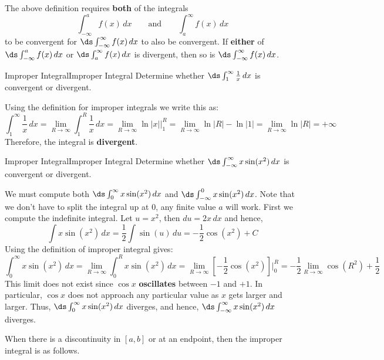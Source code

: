 The above definition requires {\bf both} of the integrals
$$\int_{-\infty}^a f(x)\,dx\qquad\mbox{and}\qquad\int_{a}^{\infty} f(x)\,dx$$
to be convergent for $\ds\int_{-\infty}^{\infty} f(x)\,dx$ to also be convergent. 
 If {\bf either} of $\ds\int_{-\infty}^a f(x)\,dx$ or $\ds\int_{a}^{\infty} f(x)\,dx$ is divergent, then so is $\ds\int_{-\infty}^{\infty} f(x)\,dx$.

\begin{example}{Improper Integral}{Improper Integral}
Determine whether $\ds\int_1^\infty\frac{1}{x}\,dx$ is convergent or divergent.
\end{example} 

\begin{solution}
 Using the definition for improper integrals we write this as:
$$	\int_1^\infty \frac{1}{x}\,dx= \lim_{R\to\infty} \int_1^R\frac{1}{x}\,dx
	= \lim_{R\to\infty} \ln|x|\bigg|_1^R
	=\lim_{R\to\infty} \ln|R| - \ln|1|
	= \lim_{R\to\infty} \ln|R|
	= +\infty$$
 Therefore, the integral is {\bf divergent}.
\end{solution}

\begin{example}{Improper Integral}{Improper Integral}
Determine whether $\ds\int_{-\infty}^\infty x\sin(x^2)\,dx$ is convergent or divergent.
\end{example}  

\begin{solution}
 We must compute both $\ds\int_0^\infty x\sin(x^2)\,dx$ and $\ds\int_{-\infty}^0 x\sin(x^2)\,dx$.  
 Note that we don't have to split the integral up at $0$, any finite value $a$ will work.  
 First we compute the indefinite integral.  
 Let $u=x^2$, then $du=2x\,dx$ and hence, 
$$\int x\sin(x^2)\,dx=\frac{1}{2} \int \sin(u)\,du=-\frac{1}{2}\cos(x^2)+C$$
Using the definition of improper integral gives: 
$$\int_0^\infty x\sin(x^2)\,dx  =  \lim_{R\to\infty} \int_0^R x\sin(x^2)\,dx 
=\lim_{R\to\infty} \left[-\frac{1}{2}\cos(x^2)\right] \bigg|_0^R 
=  -\frac{1}{2} \lim_{R\to\infty} \cos(R^2) +\frac{1}{2}$$
This limit does not exist since $\cos x$ {\bf oscillates} between $-1$ and $+1$. 
 In particular, $\cos x$ does not approach any particular value as $x$ gets larger and larger. 
 Thus, $\ds\int_0^\infty x\sin(x^2)\,dx$ diverges, and hence, $\ds\int_{-\infty}^\infty x\sin(x^2)\,dx$ diverges.
\end{solution}

When there is a discontinuity in $[a,b]$ or at an endpoint, then the improper integral is as follows.

